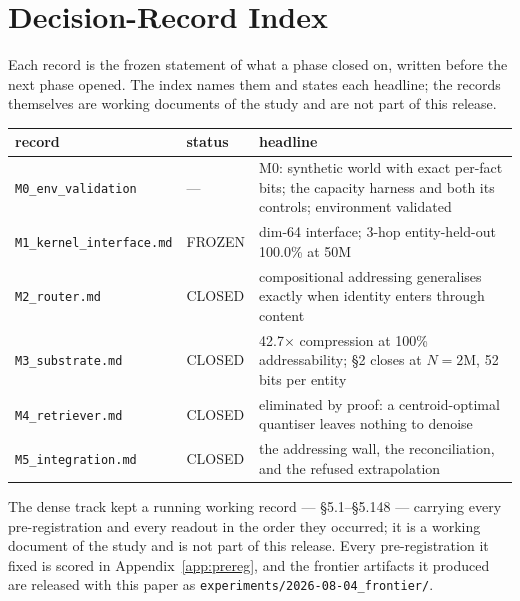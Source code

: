\section{Decision-Record Index}
\label{app:records}

Each record is the frozen statement of what a phase closed on, written before the next phase opened.
The index names them and states each headline; the records themselves are working documents of the
study and are not part of this release.

\begin{center}\small
\begin{tabular}{@{}llp{6.4cm}@{}}
\toprule
record & status & headline \\
\midrule
\texttt{M0\_env\_validation} & --- & M0: synthetic world with exact per-fact
bits; the capacity harness and both its controls; environment validated \\
\texttt{M1\_kernel\_interface.md} & FROZEN & dim-64 interface; 3-hop entity-held-out 100.0\% at 50M \\
\texttt{M2\_router.md} & CLOSED & compositional addressing generalises exactly when identity enters
through content \\
\texttt{M3\_substrate.md} & CLOSED & 42.7$\times$ compression at 100\% addressability; \S2 closes at
$N=2$M, 52 bits per entity \\
\texttt{M4\_retriever.md} & CLOSED & eliminated by proof: a centroid-optimal quantiser leaves nothing
to denoise \\
\texttt{M5\_integration.md} & CLOSED & the addressing wall, the reconciliation, and the refused
extrapolation \\
\bottomrule
\end{tabular}
\end{center}

\medskip
\noindent The dense track kept a running working record --- \S5.1--\S5.148 --- carrying every
pre-registration and every readout in the order they occurred; it is a working document of the
study and is not part of this release. Every pre-registration it fixed is scored in
Appendix~\ref{app:prereg}, and the frontier artifacts it produced are released with this paper as
\texttt{experiments/2026-08-04\_frontier/}.
